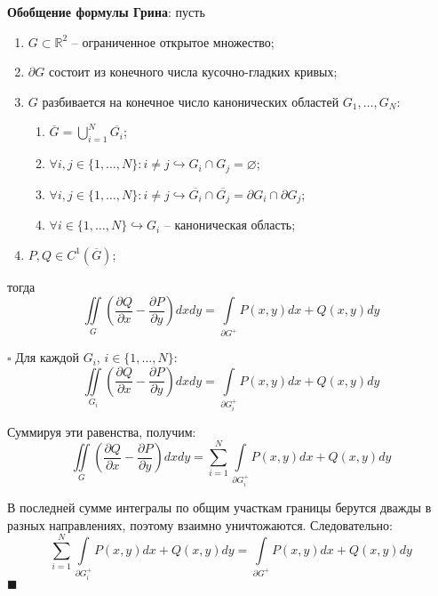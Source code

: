 \documentclass[12pt, a4paper, reqno]{article}
\begin{document}
    \textbf{Обобщение формулы Грина}: пусть
    \begin{enumerate}
        \item $G \subset \mathbb{R}^2$ -- ограниченное открытое множество;
        \item $\partial G$ состоит из конечного числа кусочно-гладких кривых;
        \item $G$ разбивается на конечное число канонических областей $G_1, \ldots, G_N$:
            \begin{enumerate}
                \item $\overline{G} = \bigcup\limits_{i = 1}^{N} \overline{G_i}$;
                \item $\forall i, j \in \{1, \ldots, N\}: i \neq j \hookrightarrow
                    G_i \cap G_j = \varnothing$;
                \item $\forall i, j \in \{1, \ldots, N\}: i \neq j \hookrightarrow
                    \overline{G_i} \cap \overline{G_j} = \partial G_i \cap \partial G_j$;
                \item $\forall i \in \{1, \ldots, N\} \hookrightarrow G_i$ -- каноническая область;
            \end{enumerate}
        \item $P, Q \in C^1(\overline{G})$;
    \end{enumerate}
    тогда
    \begin{equation*}
        \iint\limits_{G}\left(\frac{\partial Q}{\partial x} - \frac{\partial P}{\partial y}\right) dx dy =
        \int\limits_{\partial G^{+}} P(x, y)dx + Q(x, y)dy
    \end{equation*}

    $\square$
    Для каждой $G_i$, $i \in \{1, \ldots, N\}$:
    \begin{equation*}
        \iint\limits_{G_i}\left(\frac{\partial Q}{\partial x} - \frac{\partial P}{\partial y}\right) dx dy=
        \int\limits_{\partial G_{i}^{+}} P(x, y)dx + Q(x, y)dy
    \end{equation*}

    Суммируя эти равенства, получим:
    \begin{equation*}
        \iint\limits_{G}\left(\frac{\partial Q}{\partial x} - \frac{\partial P}{\partial y}\right) dx dy =
        \sum\limits_{i = 1}^{N} \int\limits_{\partial G_{i}^{+}} P(x, y)dx + Q(x, y)dy
    \end{equation*}

    В последней сумме интегралы по общим участкам границы берутся дважды в разных направлениях,
    поэтому взаимно уничтожаются. Следовательно:
    \begin{equation*}
        \sum\limits_{i = 1}^{N} \int\limits_{\partial G_{i}^{+}} P(x, y)dx + Q(x, y)dy =
        \int\limits_{\partial G^{+}} P(x, y)dx + Q(x, y)dy
    \end{equation*}
    $\blacksquare$
\end{document}

